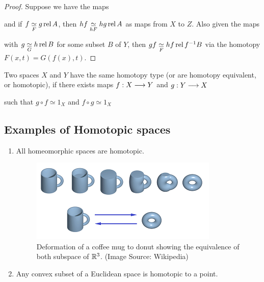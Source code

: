 \begin{proof}
    Suppose we have the maps
    \begin{center}
    \end{center}
    and if $f \underset{F}{\simeq} g \operatorname{rel} A$, then $hf \underset{hF}{\simeq} hg \operatorname{rel} A$ as maps from $X$ to $Z$. Also given the maps
    \begin{center}
    \end{center}
    with $g \underset{G}{\simeq} h \operatorname{rel} B$ for some subset $B$ of $Y$, then $gf \underset{F}{\simeq} hf \operatorname{rel} f^{-1} B$ via the homotopy $F(x,t) = G(f(x), t)$.
\end{proof}

\begin{defn}
    Two spaces $X$ and $Y$ have the same homotopy type (or are homotopy equivalent, or homotopic), if there exists maps $f: X \longrightarrow Y$ and $g : Y \longrightarrow X$
    \begin{center}
    \end{center}
    such that $g \circ f \simeq 1_X$ and $f \circ g \simeq 1_X$
\end{defn}


\subsection*{Examples of Homotopic spaces}
\begin{enumerate}
    \item All homeomorphic spaces are homotopic.
          \begin{figure}[H]
              \centering
              \includegraphics[scale=1]{images/mug-and-donut-homotopy-equivalence}
              \caption{Deformation of a coffee mug to donut showing the equivalence of both subspace of $\mathbb{R}^3$. (Image Source: Wikipedia)}\label{fig:figure}
          \end{figure}
    \item Any convex subset of a Euclidean space is homotopic to a point.
\end{enumerate}

